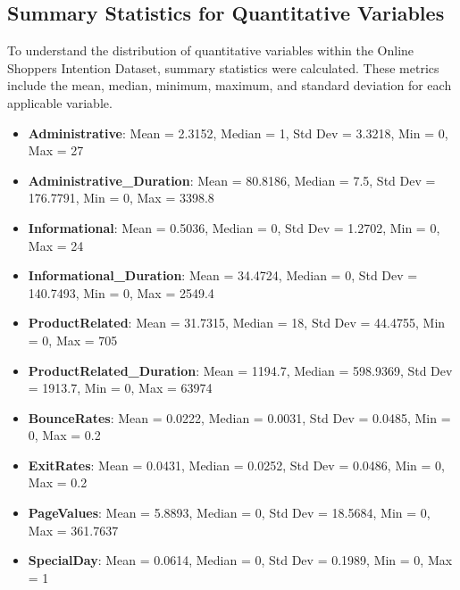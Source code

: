 \documentclass[a4paper, 12pt]{article}
\begin{document}
\subsection{Summary Statistics for Quantitative Variables}

To understand the distribution of quantitative variables within the Online Shoppers Intention Dataset, summary statistics were calculated. These metrics include the mean, median, minimum, maximum, and standard deviation for each applicable variable.

\begin{itemize}
    \item \textbf{Administrative}: Mean = 2.3152, Median = 1, Std Dev = 3.3218, Min = 0, Max = 27
    \item \textbf{Administrative\_Duration}: Mean = 80.8186, Median = 7.5, Std Dev = 176.7791, Min = 0, Max = 3398.8
    \item \textbf{Informational}: Mean = 0.5036, Median = 0, Std Dev = 1.2702, Min = 0, Max = 24
    \item \textbf{Informational\_Duration}: Mean = 34.4724, Median = 0, Std Dev = 140.7493, Min = 0, Max = 2549.4
    \item \textbf{ProductRelated}: Mean = 31.7315, Median = 18, Std Dev = 44.4755, Min = 0, Max = 705
    \item \textbf{ProductRelated\_Duration}: Mean = 1194.7, Median = 598.9369, Std Dev = 1913.7, Min = 0, Max = 63974
    \item \textbf{BounceRates}: Mean = 0.0222, Median = 0.0031, Std Dev = 0.0485, Min = 0, Max = 0.2
    \item \textbf{ExitRates}: Mean = 0.0431, Median = 0.0252, Std Dev = 0.0486, Min = 0, Max = 0.2
    \item \textbf{PageValues}: Mean = 5.8893, Median = 0, Std Dev = 18.5684, Min = 0, Max = 361.7637
    \item \textbf{SpecialDay}: Mean = 0.0614, Median = 0, Std Dev = 0.1989, Min = 0, Max = 1
\end{itemize}
\end{document}
